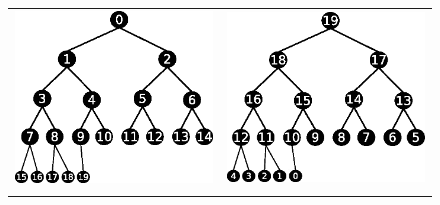 \documentclass[sigplan,review,anonymous]{acmart}\settopmatter{printfolios=true,printccs=false,printacmref=false}
\begin{document}
% 
% 

\begin{figure}[t]
 
\begin{tabular}{cc}
\includegraphics[scale=0.46]{images/complete-T1-gap.eps} &  \includegraphics[scale=0.46]{images/complete-T2-gap.eps} \\ \\

\end{tabular}
\end{figure}
\end{document}
